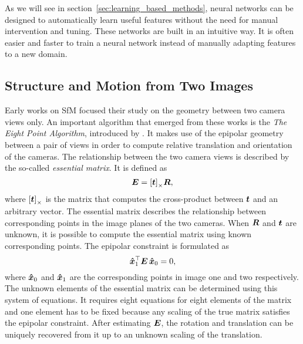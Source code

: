			As we will see in section~\ref{sec:learning_based_methods}, neural networks can be designed to automatically learn useful features without the need for manual intervention and tuning.
			These networks are built in an intuitive way.
			It is often easier and faster to train a neural network instead of manually adapting features to a new domain.

		\subsection{Structure and Motion from Two Images}
			Early works on SfM focused their study on the geometry between two camera views only.
			An important algorithm that emerged from these works is the \emph{The Eight Point Algorithm}, introduced by \cite{longuet1981}.
			It makes use of the epipolar geometry between a pair of views in order to compute relative translation and orientation of the cameras.
			The relationship between the two camera views is described by the so-called \emph{essential matrix}.
			It is defined as 
			\begin{equation}\label{eq:essential_matrix}
				\bm{E} = \left[ \bm{t} \right]_\times \! \bm{R},
			\end{equation}
			where $\left[ \bm{t} \right]_\times$ is the matrix that computes the cross-product between $\bm{t}$ and an arbitrary vector.
			The essential matrix describes the relationship between corresponding points in the image planes of the two cameras.
			When $\bm{R}$ and $\bm{t}$ are unknown, it is possible to compute the essential matrix using known corresponding points.
			The epipolar constraint is formulated as 
			\begin{equation}\label{eq:epipolar_constraint}
				\bm{\hat{x}}_1^\top \bm{E} \, \bm{\hat{x}}_0 = 0,
			\end{equation}
			where $\bm{\hat{x}}_0$ and $\bm{\hat{x}}_1$ are the corresponding points in image one and two respectively.
			The unknown elements of the essential matrix can be determined using this system of equations.
			It requires eight equations for eight elements of the matrix and one element has to be fixed because any scaling of the true matrix satisfies the epipolar constraint.
			After estimating $\bm{E}$, the rotation and translation can be uniquely recovered from it up to an unknown scaling of the translation.
			
